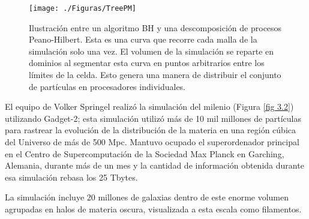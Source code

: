 \documentclass[a4paper,openright,10pt, oneside, final]{book}
\begin{document}
\begin{figure}
\centering
      \texttt{[image: ./Figuras/TreePM]}{\caption{\footnotesize{Ilustración entre un algoritmo BH y una descomposición de procesos Peano-Hilbert. Esta es una curva que recorre cada malla de la simulación solo una vez. El volumen de la simulación se reparte en dominios al segmentar esta curva en puntos arbitrarios entre los límites de la celda. Esto genera una manera de distribuir el conjunto de partículas en procesadores individuales.}}}\label{fig 3.1}%
\end{figure}

El equipo de Volker Springel realizó la simulación del milenio \cite{3.0.3} (Figura \ref{fig 3.2}) utilizando Gadget-2; esta simulación utilizó más de 10 mil millones de partículas para rastrear la evolución de la distribución de la materia en una región cúbica del Universo de más de 500 Mpc. Mantuvo ocupado el superordenador principal en el Centro de Supercomputación de la Sociedad Max Planck en Garching, Alemania, durante más de un mes y la cantidad de información obtenida durante esa simulación rebasa los 25 Tbytes.

La simulación incluye 20 millones de galaxias dentro de este enorme volumen agrupadas en halos de materia oscura, visualizada a esta escala como filamentos.\\\\\\\
\end{document}
